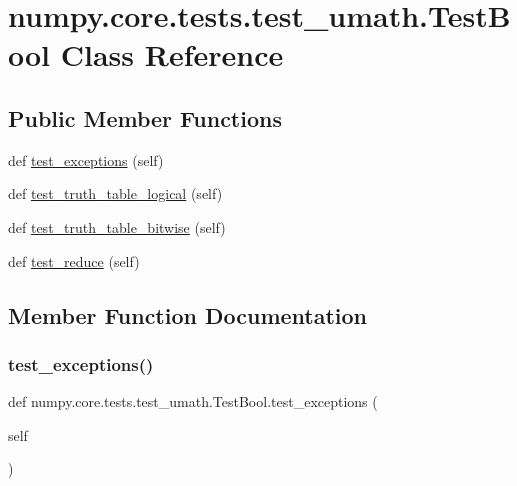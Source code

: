 \hypertarget{classnumpy_1_1core_1_1tests_1_1test__umath_1_1TestBool}{}\section{numpy.\+core.\+tests.\+test\+\_\+umath.\+Test\+Bool Class Reference}
\label{classnumpy_1_1core_1_1tests_1_1test__umath_1_1TestBool}
\subsection*{Public Member Functions}
\begin{DoxyCompactItemize}
\item 
def \hyperlink{classnumpy_1_1core_1_1tests_1_1test__umath_1_1TestBool_ab51c72836f1c46c3cd7c4cc673da3008}{test\+\_\+exceptions} (self)
\item 
def \hyperlink{classnumpy_1_1core_1_1tests_1_1test__umath_1_1TestBool_a4ebb29c9a18d475d651bd87fd630a827}{test\+\_\+truth\+\_\+table\+\_\+logical} (self)
\item 
def \hyperlink{classnumpy_1_1core_1_1tests_1_1test__umath_1_1TestBool_a5d1afee61146157cbaddb1dc8ece5ce9}{test\+\_\+truth\+\_\+table\+\_\+bitwise} (self)
\item 
def \hyperlink{classnumpy_1_1core_1_1tests_1_1test__umath_1_1TestBool_a710c529672cc7973484527327c9acb72}{test\+\_\+reduce} (self)
\end{DoxyCompactItemize}


\subsection{Member Function Documentation}
\mbox{\label{classnumpy_1_1core_1_1tests_1_1test__umath_1_1TestBool_ab51c72836f1c46c3cd7c4cc673da3008}} 
\subsubsection{\texorpdfstring{test\+\_\+exceptions()}{test\_exceptions()}}
{\footnotesize\ttfamily def numpy.\+core.\+tests.\+test\+\_\+umath.\+Test\+Bool.\+test\+\_\+exceptions (\begin{DoxyParamCaption}\item[{}]{self }\end{DoxyParamCaption})}

